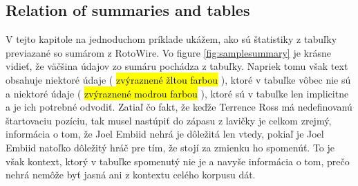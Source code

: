 \subsection{Relation of summaries and tables}

V tejto kapitole na jednoduchom príklade ukážem, ako sú štatistiky z tabuľky previazané so sumárom z RotoWire. Vo figure \ref{fig:samplesummary} je krásne vidieť, že väčšina údajov zo sumáru pochádza z tabuľky. Napriek tomu však text obsahuje niektoré údaje (  \hl{zvýraznené žltou farbou} ), ktoré v tabuľke vôbec nie sú a niektoré údaje ( \hl{zvýraznené modrou farbou} ), ktoré sú v tabuľke len implicitne a je ich potrebné odvodiť. Zatiaľ čo fakt, že keďže Terrence Ross má nedefinovanú štartovaciu pozíciu, tak musel nastúpiť do zápasu z lavičky je celkom zrejmý, informácia o tom, že Joel Embiid nehrá je dôležitá len vtedy, pokiaľ je Joel Embiid natoľko dôležitý hráč pre tím, že stojí za zmienku ho spomenúť. To je však kontext, ktorý v tabuľke spomenutý nie je a navyše informácia o tom, prečo nehrá nemôže byť jasná ani z kontextu celého korpusu dát.



